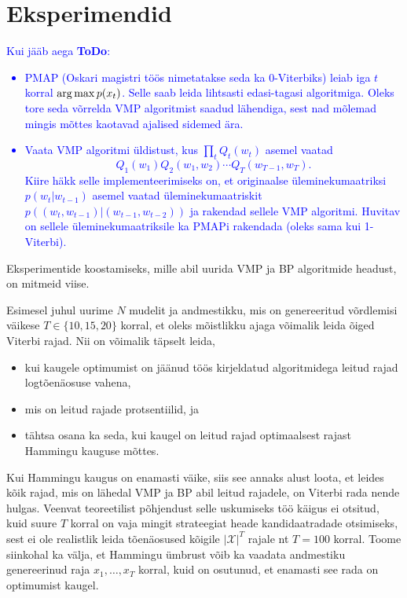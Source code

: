 \section{Eksperimendid}\label{sec:experiments}
\textcolor{blue}{Kui jääb aega \textbf{ToDo}:
\begin{itemize}
    \item PMAP (Oskari magistri töös nimetatakse seda ka 0-Viterbiks) leiab iga $t$ korral $\operatorname*{arg\,max} p(x_t)$. Selle saab leida lihtsasti edasi-tagasi algoritmiga. Oleks tore seda võrrelda VMP algoritmist saadud lähendiga, sest nad mõlemad mingis mõttes kaotavad ajalised sidemed ära.
    \item Vaata VMP algoritmi üldistust, kus $\prod_t Q_t(w_t)$ asemel vaatad $$Q_1(w_1)Q_2(w_1,w_2)\cdots Q_T(w_{T-1},w_T).$$
    Kiire häkk selle implementeerimiseks on, et originaalse üleminekumaatriksi $p(w_t|w_{t-1})$ asemel vaatad üleminekumaatriskit $p((w_t,w_{t-1})|(w_{t-1},w_{t-2}))$ ja rakendad sellele VMP algoritmi. Huvitav on sellele üleminekumaatriksile ka PMAPi rakendada (oleks sama kui 1-Viterbi).
\end{itemize}
}
Eksperimentide koostamiseks, mille abil uurida VMP ja BP algoritmide headust, on mitmeid viise. 

Esimesel juhul uurime $N$ mudelit ja andmestikku, mis on genereeritud võrdlemisi väikese $T \in \{10,15,20\}$ korral, et oleks mõistlikku ajaga võimalik leida õiged Viterbi rajad. Nii on võimalik täpselt leida,
\begin{itemize}
    \item kui kaugele optimumist on jäänud töös kirjeldatud algoritmidega leitud rajad logtõenäosuse vahena,
    \item mis on leitud rajade protsentiilid, ja
    \item tähtsa osana ka seda, kui kaugel on leitud rajad optimaalsest rajast Hammingu kauguse mõttes.
\end{itemize}
Kui Hammingu kaugus on enamasti väike, siis see annaks alust loota, et leides kõik rajad, mis on lähedal VMP ja BP abil leitud rajadele, on Viterbi rada nende hulgas. Veenvat teoreetilist põhjendust selle uskumiseks töö käigus ei otsitud, kuid suure $T$ korral on vaja mingit strateegiat heade kandidaatradade otsimiseks, sest ei ole realistlik leida tõenäosused kõigile $|\mathcal{X}|^T$ rajale nt $T=100$ korral. Toome siinkohal ka välja, et Hammingu ümbrust võib ka vaadata andmestiku genereerinud raja $x_1,\ldots,x_T$ korral, kuid on osutunud, et enamasti see rada on optimumist kaugel.

